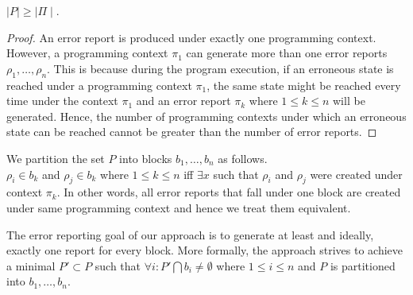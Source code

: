 {\begin{theorem}
$\mid P\mid \ge \mid \Pi \mid$.
\end{theorem}

\begin{proof}
An error report is produced under exactly one programming context. However, a
programming context $\pi_1$ can generate more than one error reports $\rho_1, \ldots ,\rho_n$. This is because during the program
execution, if an erroneous state is reached under a programming context $\pi_1$, the same state might be reached every time
under the context $\pi_1$ and an error report $\pi_k$ where $1 \le k \le n$ will be generated. Hence, the number of programming
contexts under which an erroneous state can be reached cannot be greater than the number of error reports.
\end{proof}

We partition the set $P$ into blocks $b_1, \ldots , b_n$ as follows. \\
$\rho_i \in b_k$ and $\rho_j \in b_k$ where  $1 \le k \le n$
iff $\exists x$ such that $\rho_i$ and $\rho_j$ were created under context $\pi_k$.
In other words, all error reports that fall under one block are created under same
programming context and hence we treat them equivalent.

The error reporting goal of our approach is to generate at least and ideally, exactly one report
for every block. More formally, the approach strives to achieve a minimal $P' \subset P$
such that $\forall i : P' \bigcap b_i \ne \emptyset$ where $1 \le i \le n$ and $P$ is partitioned into
$b_1, \ldots, b_n$.
}
